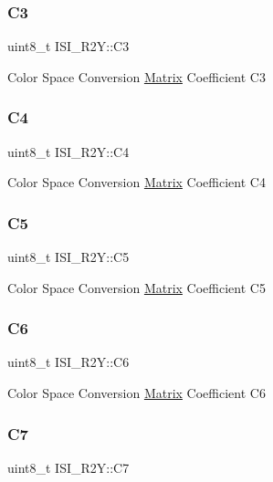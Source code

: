 \subsubsection{\texorpdfstring{C3}{C3}}
{\footnotesize\ttfamily uint8\+\_\+t I\+S\+I\+\_\+\+R2\+Y\+::\+C3}

Color Space Conversion \mbox{\hyperlink{structMatrix}{Matrix}} Coefficient C3 \mbox{\label{structISI__R2Y_a98325a6c66a6c93e6bdb19d878584dd2}} 
\subsubsection{\texorpdfstring{C4}{C4}}
{\footnotesize\ttfamily uint8\+\_\+t I\+S\+I\+\_\+\+R2\+Y\+::\+C4}

Color Space Conversion \mbox{\hyperlink{structMatrix}{Matrix}} Coefficient C4 \mbox{\label{structISI__R2Y_a3b190bfa1868d69369d2a58a6d20019b}} 
\subsubsection{\texorpdfstring{C5}{C5}}
{\footnotesize\ttfamily uint8\+\_\+t I\+S\+I\+\_\+\+R2\+Y\+::\+C5}

Color Space Conversion \mbox{\hyperlink{structMatrix}{Matrix}} Coefficient C5 \mbox{\label{structISI__R2Y_a4d1fffa637b855f879d7ec5a7489675c}} 
\subsubsection{\texorpdfstring{C6}{C6}}
{\footnotesize\ttfamily uint8\+\_\+t I\+S\+I\+\_\+\+R2\+Y\+::\+C6}

Color Space Conversion \mbox{\hyperlink{structMatrix}{Matrix}} Coefficient C6 \mbox{\label{structISI__R2Y_ab557b6eb689bd7ba0a340358074e59e7}} 
\subsubsection{\texorpdfstring{C7}{C7}}
{\footnotesize\ttfamily uint8\+\_\+t I\+S\+I\+\_\+\+R2\+Y\+::\+C7}

